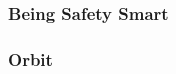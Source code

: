 
\subsubsection{Being Safety Smart}\label{sssec:Being}




\subsubsection{Orbit}\label{sssec:Orbit}


